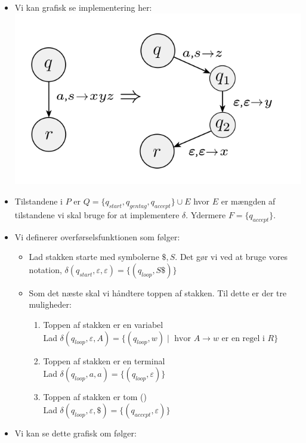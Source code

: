 \begin{frame}[allowframebreaks]
\begin{itemize}
		\item Vi kan grafisk se implementering her:
		      \includegraphics[scale=0.5]{figur/figur223.png}
		\item Tilstandene i $P$ er $Q = \{q_{start}, q_{gentag}, q_{accept}\} \cup E$ hvor $E$ er mængden af tilstandene vi skal bruge for at implementere \(\delta\). Ydermere $F = \{q_{accept}\}$.
		\item Vi definerer overførselsfunktionen som følger:
		      \begin{itemize}
			      \item Lad stakken starte med symbolerne $\mathdollar, S$. Det gør vi ved at bruge vores notation, $\delta(q_{start}, \varepsilon, \varepsilon) = \{(q_{loop}, S \mathdollar)\}$
			      \item Som det næste skal vi håndtere toppen af stakken. Til dette er der tre muligheder:
			            \begin{enumerate}
				            \item Toppen af stakken er en variabel\\ Lad $\delta(q_{loop}, \varepsilon, A) = \{(q_{loop}, w) \mid \text{ hvor } A \rightarrow w \text{ er en regel i }R\}$
				            \item Toppen af stakken er en terminal\\ Lad $\delta(q_{loop}, a, a) = \{(q_{loop}, \varepsilon)\}$
				            \item Toppen af stakken er tom (\textdollar) \\ Lad $\delta(q_{loop}, \varepsilon, \mathdollar) = \{(q_{accept}, \varepsilon)\}$
			            \end{enumerate}
		      \end{itemize}

		\item Vi kan se dette grafisk om følger:


\end{itemize}
\end{frame}
